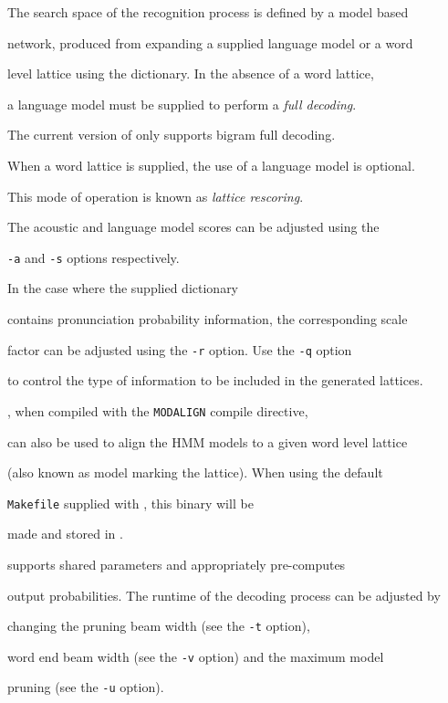The search space of the recognition process is defined by a model based 


network, produced from expanding a supplied language model or a word 


level lattice using the dictionary. In the absence of a word lattice,


a language model must be supplied to perform a \emph{full decoding}. 


The current version of  only supports bigram full decoding.


When a word lattice is supplied, the use of a language model is optional. 


This mode of operation is known as \emph{lattice rescoring}.


The acoustic and language model scores can be adjusted using the


\texttt{-a} and \texttt{-s} options respectively. 


In the case where the supplied dictionary


contains pronunciation probability information, the corresponding scale


factor can be adjusted using the \texttt{-r} option. Use the \texttt{-q} option


to control the type of information to be included in the generated lattices.





, when compiled with the \texttt{MODALIGN} compile directive,


can also be used to align the HMM models to a given word level lattice


(also known as model marking the lattice). When using the default


\texttt{Makefile} supplied with , this binary will be


made and stored in .





 supports shared parameters and appropriately pre-computes 


output probabilities. The runtime of the decoding process can be adjusted by


changing the pruning beam width (see the \texttt{-t} option), 


word end beam width (see the \texttt{-v} option) and the maximum model 


pruning (see the \texttt{-u} option).



